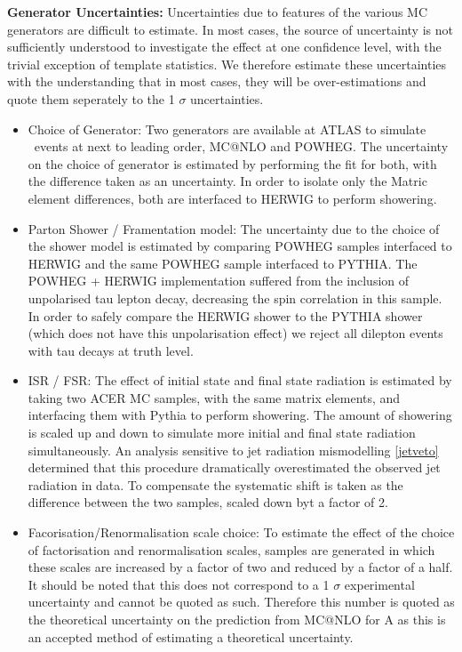 \vspace{5mm} 
\noindent
\textbf{Generator Uncertainties:} Uncertainties due to features of the various MC generators are difficult to estimate. In most cases, the source of uncertainty is not sufficiently understood to investigate the effect at one confidence level, with the trivial exception of template statistics. We therefore estimate these uncertainties with the understanding that in most cases, they will be over-estimations and quote them seperately to the 1 $\sigma$ uncertainties.
 
\begin{itemize}
    \item Choice of Generator: Two generators are available at ATLAS to simulate \ttbar\ events at next to leading order, MC@NLO and POWHEG. The uncertainty on the choice of generator is estimated by performing the fit for both, with the difference taken as an uncertainty. In order to isolate only the Matric element differences, both are interfaced to HERWIG to perform showering. 

    \item Parton Shower / Framentation model: The uncertainty due to the choice of the shower model is estimated by comparing POWHEG samples interfaced to HERWIG and the same POWHEG sample interfaced to PYTHIA. The POWHEG + HERWIG implementation suffered from the inclusion of unpolarised tau lepton decay, decreasing the spin correlation in this sample. In order to safely compare the HERWIG shower to the PYTHIA shower (which does not have this unpolarisation effect) we reject all dilepton events with tau decays at truth level.

    \item ISR / FSR: The effect of initial state and final state radiation is estimated by taking two ACER MC samples, with the same matrix elements, and interfacing them with Pythia to perform showering. The amount of showering is scaled up and down to simulate more initial and final state radiation simultaneously. An analysis sensitive to jet radiation mismodelling \ref{jetveto} determined that this procedure dramatically overestimated the observed jet radiation in data. To compensate the systematic shift is taken as the difference between the two samples, scaled down byt a factor of 2.

    \item Facorisation/Renormalisation scale choice: To estimate the effect of the choice of factorisation and renormalisation scales, samples are generated in which these scales are increased by a factor of two and reduced by a factor of a half. It should be noted that this does not correspond to a 1 $\sigma$ experimental uncertainty and cannot be quoted as such. Therefore this number is quoted as the theoretical uncertainty on the prediction from MC@NLO for A as this is an accepted method of estimating a theoretical uncertainty. 


\end{itemize}
